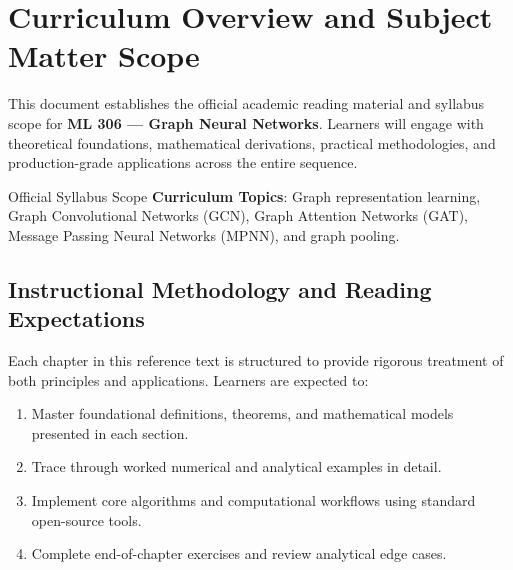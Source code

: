 \section{Curriculum Overview and Subject Matter Scope}

This document establishes the official academic reading material and syllabus scope for \textbf{ML 306 --- Graph Neural Networks}. Learners will engage with theoretical foundations, mathematical derivations, practical methodologies, and production-grade applications across the entire sequence.

\begin{InsightBox}{Official Syllabus Scope}
  \textbf{Curriculum Topics}: Graph representation learning, Graph Convolutional Networks (GCN), Graph Attention Networks (GAT), Message Passing Neural Networks (MPNN), and graph pooling.
\end{InsightBox}

\subsection{Instructional Methodology and Reading Expectations}

Each chapter in this reference text is structured to provide rigorous treatment of both principles and applications. Learners are expected to:
\begin{enumerate}
  \item Master foundational definitions, theorems, and mathematical models presented in each section.
  \item Trace through worked numerical and analytical examples in detail.
  \item Implement core algorithms and computational workflows using standard open-source tools.
  \item Complete end-of-chapter exercises and review analytical edge cases.
\end{enumerate}

